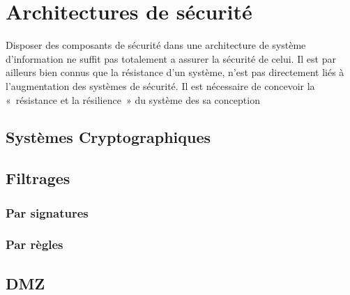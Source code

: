 

\section{Architectures de sécurité}

Disposer des composants de sécurité dans une architecture de système d'information ne suffit pas totalement a assurer la sécurité de celui. Il est par ailleurs bien connus que la résistance d'un système, n'est pas directement liés à l'augmentation des systèmes de sécurité. Il est nécessaire de concevoir la « résistance et la résilience » du système des sa conception

\subsection{Systèmes Cryptographiques}

\utodo

\subsection{Filtrages}

\subsubsection{Par signatures}
\utodo

\subsubsection{Par règles}
\utodo

\subsection{DMZ}

\utodo




